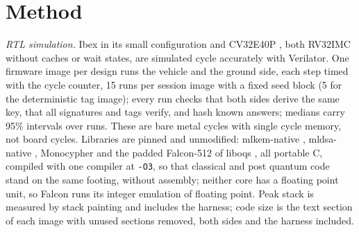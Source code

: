 \documentclass[conference]{IEEEtran}
\begin{document}
\section{Method}
\label{sec:method}
\emph{RTL simulation.} Ibex in its small configuration \cite{ibex} and CV32E40P \cite{cv32e40p}, both RV32IMC without caches or wait states, are simulated cycle accurately with Verilator. One firmware image per design runs the vehicle and the ground side, each step timed with the cycle counter, 15 runs per session image with a fixed seed block (5 for the deterministic tag image); every run checks that both sides derive the same key, that all signatures and tags verify, and hash known answers; medians carry 95\% intervals over runs. These are bare metal cycles with single cycle memory, not board cycles. Libraries are pinned and unmodified: mlkem-native \cite{mlkemnative}, mldsa-native \cite{mldsanative}, Monocypher \cite{monocypher} and the padded Falcon-512 of liboqs \cite{liboqs,falcon}, all portable C, compiled with one compiler at \texttt{-O3}, so that classical and post quantum code stand on the same footing, without assembly; neither core has a floating point unit, so Falcon runs its integer emulation of floating point. Peak stack is measured by stack painting and includes the harness; code size is the text section of each image with unused sections removed, both sides and the harness included.
\end{document}
